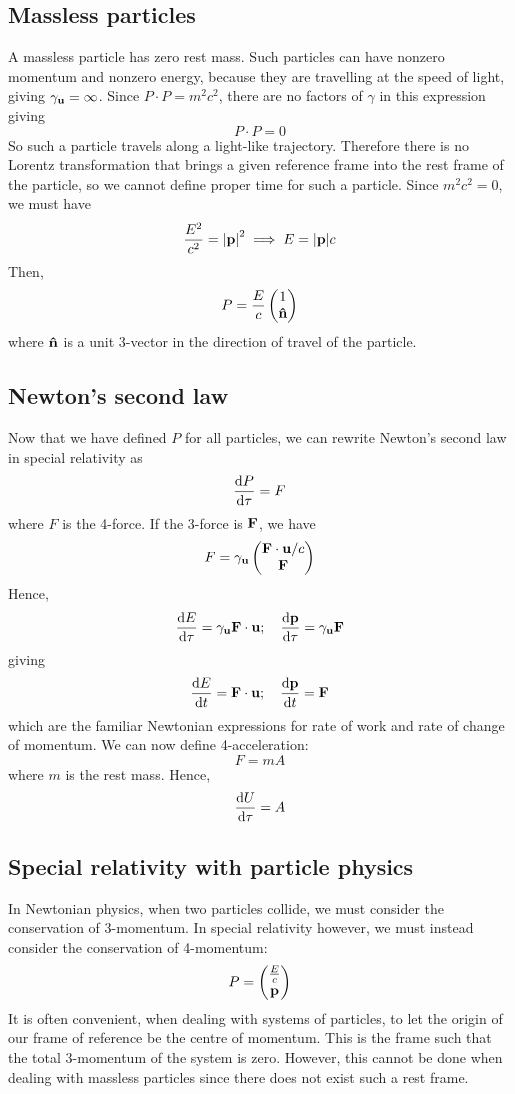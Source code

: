 \subsection{Massless particles}
A massless particle has zero rest mass.
Such particles can have nonzero momentum and nonzero energy, because they are travelling at the speed of light, giving \(\gamma_{\vb u} = \infty\).
Since \(P \cdot P = m^2c^2\), there are no factors of \(\gamma\) in this expression giving
\[
	P \cdot P = 0
\]
So such a particle travels along a light-like trajectory.
Therefore there is no Lorentz transformation that brings a given reference frame into the rest frame of the particle, so we cannot define proper time for such a particle.
Since \(m^2c^2 = 0\), we must have
\[
	\frac{E^2}{c^2} = \abs{\vb p}^2 \implies E = \abs{\vb p}c
\]
Then,
\[
	P = \frac{E}{c} \begin{pmatrix}
		1 \\ \vu n
	\end{pmatrix}
\]
where \(\vu n\) is a unit 3-vector in the direction of travel of the particle.

\subsection{Newton's second law}
Now that we have defined \(P\) for all particles, we can rewrite Newton's second law in special relativity as
\[
	\dv{P}{\tau} = F
\]
where \(F\) is the 4-force.
If the 3-force is \(\vb F\), we have
\[
	F = \gamma_{\vb u} \begin{pmatrix}
		\vb F \cdot \vb u / c \\
		\vb F
	\end{pmatrix}
\]
Hence,
\[
	\dv{E}{\tau} = \gamma_{\vb u} \vb F \cdot \vb u;\quad \dv{\vb p}{\tau} = \gamma_{\vb u} \vb F
\]
giving
\[
	\dv{E}{t} = \vb F \cdot \vb u;\quad \dv{\vb p}{t} = \vb F
\]
which are the familiar Newtonian expressions for rate of work and rate of change of momentum.
We can now define 4-acceleration:
\[
	F = mA
\]
where \(m\) is the rest mass.
Hence,
\[
	\dv{U}{\tau} = A
\]

\subsection{Special relativity with particle physics}
In Newtonian physics, when two particles collide, we must consider the conservation of 3-momentum.
In special relativity however, we must instead consider the conservation of 4-momentum:
\[
	P = \begin{pmatrix}
		\frac{E}{c} \\ \vb p
	\end{pmatrix}
\]
It is often convenient, when dealing with systems of particles, to let the origin of our frame of reference be the centre of momentum.
This is the frame such that the total 3-momentum of the system is zero.
However, this cannot be done when dealing with massless particles since there does not exist such a rest frame.

